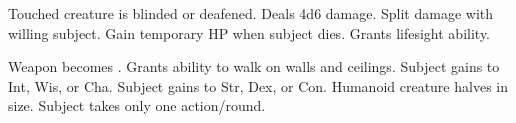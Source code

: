 \begin{swspelllist}
   Touched creature is blinded or deafened.
   Deals 4d6 damage.
   Split damage with willing subject.
   Gain temporary HP when subject dies.
   Grants lifesight ability. 

   Weapon becomes .
   Grants ability to walk on walls and ceilings.
   Subject gains  to Int, Wis, or Cha.
   Subject gains  to Str, Dex, or Con.
   Humanoid creature halves in size.
   Subject takes only one action/round.
\end{swspelllist}

